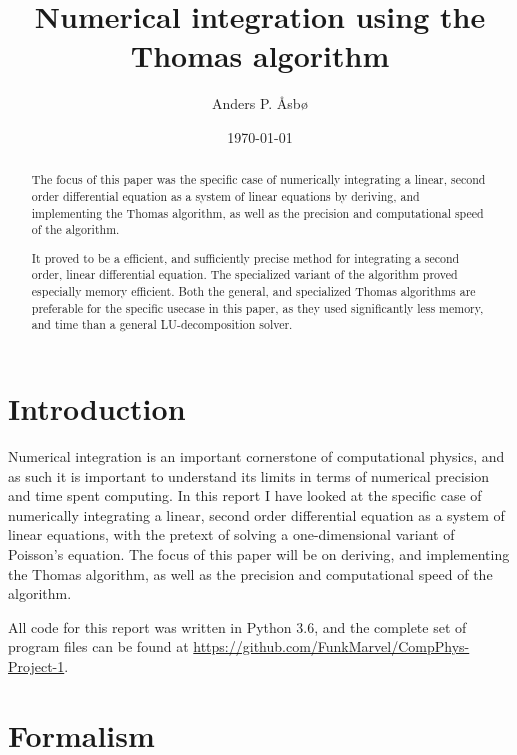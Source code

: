 \documentclass[english,notitlepage,reprint]{revtex4-1}  %
\begin{document}
\title{Numerical integration using the Thomas algorithm}   %
\author{Anders P. Åsbø}               %
\date{\today}
\noaffiliation                            %

\begin{abstract}
The focus of this paper was the specific case of numerically integrating a linear, second order differential equation as a system of linear equations by deriving, and implementing the Thomas algorithm\citep{Datta2010}, as well as the precision and computational speed of the algorithm.

It proved to be a efficient, and sufficiently precise method for integrating a second order, linear differential equation. The specialized variant of the algorithm proved especially memory efficient. Both the general, and specialized Thomas algorithms are preferable for the specific usecase in this paper, as they used significantly less memory, and time than a general LU-decomposition solver.
\end{abstract}

\maketitle
\tableofcontents

\section{Introduction}\label{sec:1}
Numerical integration is an important cornerstone of computational physics, and as such it is important to understand its limits in terms of numerical precision and time spent computing. In this report I have looked at the specific case of numerically integrating a linear, second order differential equation as a system of linear equations, with the pretext of solving a one-dimensional variant of Poisson's equation. The focus of this paper will be on deriving, and implementing the Thomas algorithm\citep{Datta2010}, as well as the precision and computational speed of the algorithm.

All code for this report was written in Python 3.6, and the complete set of program files can be found at \url{https://github.com/FunkMarvel/CompPhys-Project-1}.

\section{Formalism}\label{sec:2}
\end{document}
